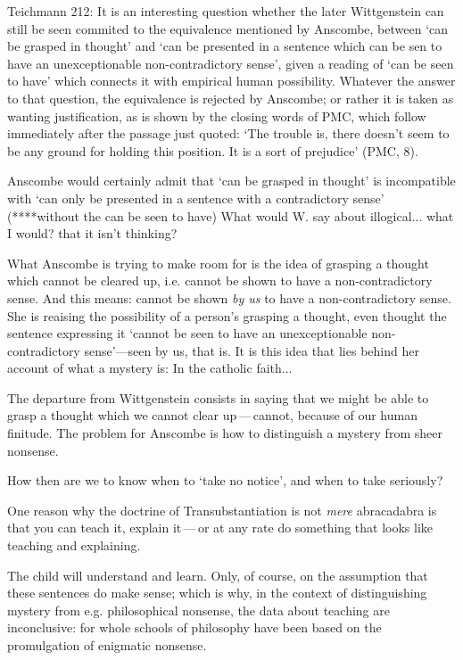 Teichmann 212:
It is an interesting question whether the later Wittgenstein can still be seen commited to the equivalence mentioned by Anscombe, between `can be grasped in thought' and `can be presented in a sentence which can be sen to have an unexceptionable non-contradictory sense', given a reading of `can be seen to have' which connects it with empirical human possibility. Whatever the answer to that question, the equivalence is rejected by Anscombe; or rather it is taken as wanting justification, as is shown by the closing words of PMC, which follow immediately after the passage just quoted: `The trouble is, there doesn't seem to be any ground for holding this position. It is a sort of prejudice' (PMC, 8).

Anscombe would certainly admit that `can be grasped in thought' is incompatible with `can only be presented in a sentence with a contradictory sense' (****without the can be seen to have)
What would W. say about illogical... what I would? that it isn't thinking?

What Anscombe is trying to make room for is the idea of grasping a thought which cannot be cleared up, i.e. cannot be shown to have a non-contradictory sense. And this means: cannot be shown \emph{by us} to have a non-contradictory sense. She is reaising the possibility of a person's grasping a thought, even thought the sentence expressing it `cannot be seen to have an unexceptionable non-contradictory sense'---seen by us, that is. It is this idea that lies behind her account of what a mystery is:
In the catholic faith...

The departure from Wittgenstein consists in saying that we might be able to grasp a thought which we cannot clear up\,---\,cannot, because of our human finitude. The problem for Anscombe is how to distinguish a mystery from sheer nonsense.

How then are we to know when to `take no notice', and when to take seriously?

One reason why the doctrine of Transubstantiation is not \emph{mere} abracadabra is that you can teach it, explain it\,---\,or at any rate do something that looks like teaching and explaining.

The child will understand and learn. Only, of course, on the assumption that these sentences do make sense; which is why, in the context of distinguishing mystery from e.g. philosophical nonsense, the data about teaching are inconclusive: for whole schools of philosophy have been based on the promulgation of enigmatic nonsense.

